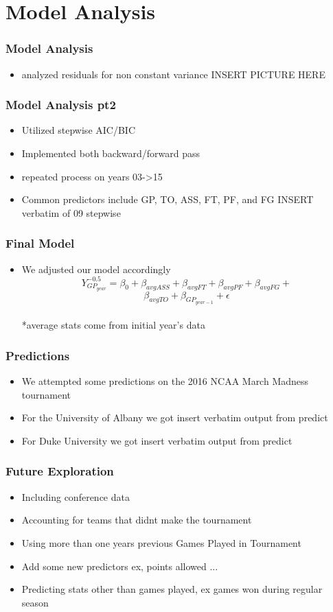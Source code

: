 \documentclass[11pt]{beamer}
\begin{document}
\section{Model Analysis}
\begin{frame}
\frametitle{{\textbf{\huge Model Analysis}}}
\begin{itemize}
	\item analyzed residuals for non constant variance
	INSERT PICTURE HERE
\end{itemize}
\end{frame}
\begin{frame}
\frametitle{{\textbf{\huge Model Analysis pt2}}}
\begin{itemize}
	\item Utilized stepwise AIC/BIC
	\item Implemented both backward/forward pass
	\item repeated process on years 03->15
	\item Common predictors include GP, TO, ASS, FT, PF, and FG
	INSERT verbatim of 09 stepwise
\end{itemize}
\end{frame}
\begin{frame}
\frametitle{{\textbf{\huge Final Model}}}
\begin{itemize}
	\item We adjusted our model accordingly
	\large
	\[
	Y_{GP_{year}}^{-0.5} = \beta_0 + \beta_{avgASS} +\beta_{avgFT} + \beta_{avgPF} + \beta_{avgFG} + 
	\]
	\[
	\beta_{avgTO} + \beta_{GP_{year-1}}+ \epsilon 
	\]
	\\
	\footnotesize
	*average stats come from initial year's data
\end{itemize}
\end{frame}
\begin{frame}
\frametitle{{\textbf{\huge Predictions}}}
\begin{itemize}
	\item We attempted some predictions on the 2016 NCAA March Madness tournament
	\item For the University of Albany we got
	insert verbatim output from predict
	\item For Duke University we got 
	insert verbatim output from predict 
\end{itemize}
\end{frame}
\begin{frame}
\frametitle{{\textbf{\huge Future Exploration}}}
\begin{itemize}
	\item Including conference data
	\item Accounting for teams that didnt make the tournament
	\item Using more than one years previous Games Played in Tournament
	\item Add some new predictors ex, points allowed ...
	\item Predicting stats other than games played, ex games won during regular season
\end{itemize}
\end{frame}
\end{document}
